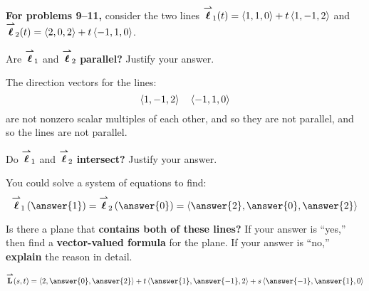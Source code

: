 \documentclass{ximera}
\author{Michigan Exam Winter 2016}
\begin{document}
\textbf{For problems 9--11,} consider the two lines ${\overset{\boldsymbol{\rightharpoonup}}{\mathbf{\boldsymbol{\ell}}}}_1(t)
=\left\langle 1,1,0\right\rangle+t\left\langle 1,-1,2\right\rangle$ and ${\overset{\boldsymbol{\rightharpoonup}}{\mathbf{\boldsymbol{\ell}}}}_2(t) =
\left\langle 2,0,2\right\rangle+t\left\langle -1,1,0\right\rangle$.
\begin{problem}
  Are ${\overset{\boldsymbol{\rightharpoonup}}{\mathbf{\boldsymbol{\ell}}}}_1$ and ${\overset{\boldsymbol{\rightharpoonup}}{\mathbf{\boldsymbol{\ell}}}}_2$ \textbf{parallel?} Justify your answer.
  \begin{prompt}
    \begin{multipleChoice}
    \end{multipleChoice}
    \begin{feedback}[correct]
      The direction vectors for the lines:
      \[
      \left\langle 1,-1,2\right\rangle \quad \left\langle -1,1,0\right\rangle
      \]
      are not nonzero scalar multiples of each other, and so they are
      not parallel, and so the lines are not parallel.
    \end{feedback}
  \end{prompt}
  
  \vfill
  
\end{problem}



\begin{problem}
  Do ${\overset{\boldsymbol{\rightharpoonup}}{\mathbf{\boldsymbol{\ell}}}}_1$ and ${\overset{\boldsymbol{\rightharpoonup}}{\mathbf{\boldsymbol{\ell}}}}_2$ \textbf{intersect?} Justify your answer.
  \begin{prompt}
    \begin{multipleChoice}
    \end{multipleChoice}
    \begin{problem}
      You could solve a system of equations to find:
      \[
      \vecl_1\left(\answer{1}\right) = \vecl_2\left(\answer{0}\right) =
      \vector{\answer{2},\answer{0},\answer{2}}
      \]
    \end{problem}
  \end{prompt}

  
  \vfill
  
\end{problem}


\begin{problem}
  Is there a plane that \textbf{contains both of these lines?} If your answer
  is ``yes,'' then find a \textbf{vector-valued formula} for the plane. If your
  answer is ``no,'' \textbf{explain} the reason in detail.
  \begin{prompt}
    \begin{multipleChoice}
    \end{multipleChoice}
    \begin{problem}
      \[
      \vec{L}(s,t) = \vector{2,\answer{0},\answer{2}} + t \vector{\answer{1},\answer{-1},2} + s \vector{\answer{-1},\answer{1},0}
      \]
    \end{problem}
  \end{prompt}
  
  \vfill
  
\end{problem}
\end{document}
